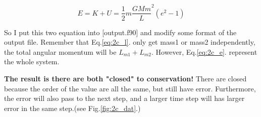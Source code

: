\documentclass{article}
\begin{document}
\begin{equation}
E = K + U=\frac{1}{2}m{\frac{GMm}{L}}^2(e^2-1)
\label{eq:2c_e}
\end{equation}

So I put this two equation into [output.f90] and modify some format of the output file.
Remember that Eq.\ref{eq:2c_l}. only get mass1 or mass2 independently, the total angular momentum will be $L_{m1}+L_{m2}$. However, Eq.\ref{eq:2c_e}. represent the whole system.

\textbf{The result is there are both "closed" to conservation!}
There are closed because the order of the value are all the same, but still have error. Furthermore, the error will also pass to the next step, and a larger time step will has larger error in the same step.(see Fig.\ref{fig:2c_dat}.)

\end{document}
